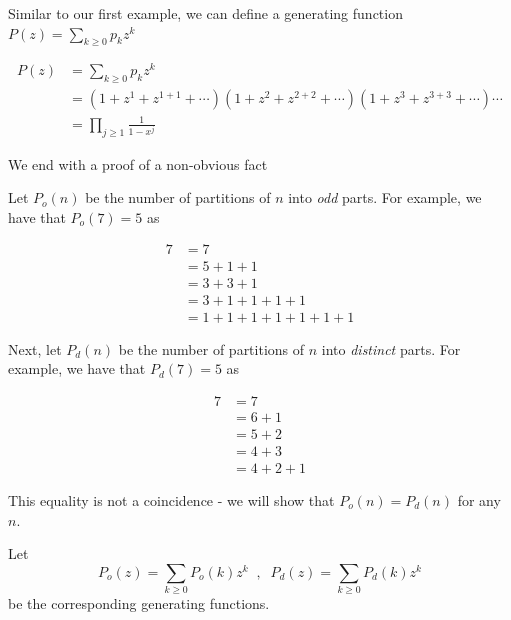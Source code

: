 \documentclass[aspectratio=169]{beamer}
\begin{document}
\begin{frame}
Similar to our first example, we can define a generating function $ P(z) = \sum_{k \ge 0} p_k z^k $

\begin{align*}
P(z) &= \sum_{k \ge 0} p_k z^k \\
&= (1 + z^1 + z^{1+1} + \cdots)(1 + z^2 + z^{2+2} + \cdots)(1 + z^{3}+ z^{3+3} + \cdots) \cdots \\
&= \prod_{j \ge 1} \frac{1}{1-x^j}
\end{align*}

\end{frame}

\begin{frame}

We end with a proof of a non-obvious fact


Let $ P_o(n) $ be the number of partitions of $n$ into \textit{odd} parts. For example, we have that $ P_o(7) = 5 $ as

\begin{align*}
7 &= 7 \\
&= 5 + 1 + 1 \\
&= 3 + 3 + 1 \\
&= 3 + 1 + 1 + 1 + 1 \\
&= 1 + 1 + 1 + 1 + 1 + 1 + 1
\end{align*}

\end{frame}

\begin{frame}

Next, let $P_d(n)$ be the number of partitions of $n$ into \textit{distinct} parts. For example, we have that $ P_d(7) = 5$ as

\begin{align*}
7 &= 7 \\
&= 6 + 1\\
&= 5 + 2 \\
&= 4 + 3\\
&= 4 + 2 + 1
\end{align*}

\end{frame}


\begin{frame}

This equality is not a coincidence - we will show that $ P_o(n) = P_d(n)$ for any $n$.

Let $$P_o(z) = \sum_{k \ge 0} P_o(k) z^k \;\; , \;\; P_d(z) = \sum_{k \ge 0} P_d(k) z^k $$ be the corresponding generating functions.

\end{frame}
\end{document}
